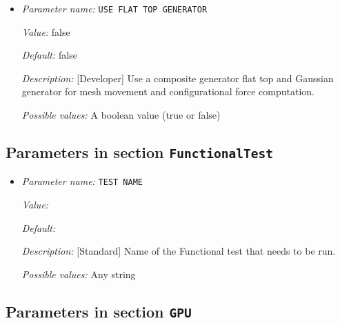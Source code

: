 \begin{itemize}
{\it Value:} 0.1


{\it Default:} 0.1


{\it Description:} [Developer] Top fraction of elements to be refined.


{\it Possible values:} A floating point number $v$ such that $0 \leq v \leq 1$
\item {\it Parameter name:} {\tt USE FLAT TOP GENERATOR}
\label{parameters:Finite element mesh parameters/Auto mesh generation parameters/USE FLAT TOP GENERATOR}
\label{parameters:Finite_20element_20mesh_20parameters/Auto_20mesh_20generation_20parameters/USE_20FLAT_20TOP_20GENERATOR}


{\it Value:} false


{\it Default:} false


{\it Description:} [Developer] Use a composite generator flat top and Gaussian generator for mesh movement and configurational force computation.


{\it Possible values:} A boolean value (true or false)
\end{itemize}

\subsection{Parameters in section \tt FunctionalTest}
\label{parameters:FunctionalTest}

\begin{itemize}
\item {\it Parameter name:} {\tt TEST NAME}
\label{parameters:FunctionalTest/TEST NAME}
\label{parameters:FunctionalTest/TEST_20NAME}


{\it Value:} 


{\it Default:} 


{\it Description:} [Standard] Name of the Functional test that needs to be run.


{\it Possible values:} Any string
\end{itemize}

\subsection{Parameters in section \tt GPU}
\label{parameters:GPU}

